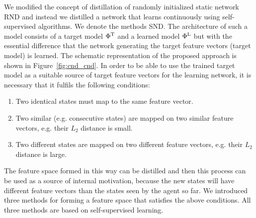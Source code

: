 \documentclass[a4paper,11pt]{elsarticle}
\begin{document}
We modified the concept of distillation of randomly initialized static network RND \citep{burda2018exploration} and instead we distilled a network that learns continuously using self-supervised algorithms. We denote the methods SND. The architecture of such a model consists of a target model $\Phi^{\rm T}$ and a learned model $\Phi^{\rm L}$ but with the essential difference that the network generating the target feature vectors (target model) is learned. The schematic representation of the proposed approach is shown in Figure~\ref{fig:cnd_cnd}.
In order to be able to use the trained target model as a suitable source of target feature vectors for the learning network, it is necessary that it fulfils the following conditions:
\begin{enumerate}
\item Two identical states must map to the same feature vector.
\item Two similar (e.g. consecutive states) are mapped on two similar feature vectors, e.g. their $L_{2}$ distance is small.
\item Two different states are mapped on two different feature vectors, e.g. their $L_{2}$ distance is large.
\end{enumerate}

The feature space formed in this way can be distilled and then this process can be used as a source of internal motivation, because the new states will have different feature vectors than the states seen by the agent so far.
We introduced three methods for forming a feature space that satisfies the above conditions. All three methods are based on self-supervised learning.
\end{document}
